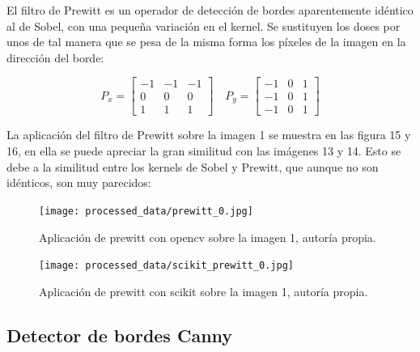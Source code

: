\documentclass[a4paper,12pt]{article}
\begin{document}
{El filtro de Prewitt es un operador de detección de bordes aparentemente idéntico al de Sobel, con una pequeña variación en el kernel. Se sustituyen
los doses por unos de tal manera que se pesa de la misma forma los píxeles de la imagen en la dirección del borde:

\vspace{0.5cm}

\[
  P_x = \begin{bmatrix} -1 & -1 & -1 \\ 0 & 0 & 0 \\ 1 & 1 & 1 \end{bmatrix} \quad P_y =  \begin{bmatrix} -1 & 0 & 1 \\ -1 & 0 & 1 \\ -1 & 0 & 1 \end{bmatrix}
\]

\vspace{0.5cm}

La aplicación del filtro de Prewitt sobre la imagen 1 se muestra en las figura 15 y 16, en ella se puede apreciar la gran similitud con las imágenes 13 y 14. 
Esto se debe a la similitud entre los kernels de Sobel y Prewitt, que aunque no son idénticos, son muy parecidos:

\vspace{0.5cm}

\begin{figure}[H]

  \begin{minipage}[t]{0.35\textwidth}
      \centering
      \texttt{[image: processed\_data/prewitt\_0.jpg]} 
      \caption{Aplicación de prewitt con opencv sobre la imagen 1, autoría propia.}
      \label{fig:cv2-prewitt}
  \end{minipage}
  \hfill
  \hspace{1.5cm}
  \begin{minipage}[t]{0.35\textwidth}
      \centering
      \texttt{[image: processed\_data/scikit\_prewitt\_0.jpg]} 
      \caption{Aplicación de prewitt con scikit sobre la imagen 1, autoría propia.}
      \label{fig:scikit-prewitt}
  \end{minipage}
  
\end{figure}

\vspace{0.5cm}

\subsection{Detector de bordes Canny}

}
\end{document}
